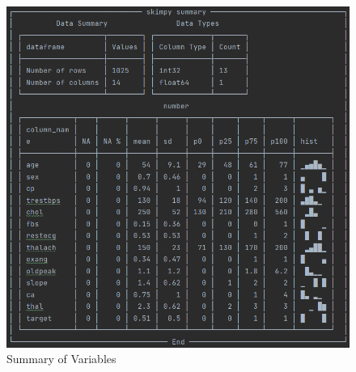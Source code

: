 \begin{figure}[b]
\includegraphics[width=\textwidth]{plots/Screenshot 2022-11-08 205742}
     \caption[Figure]{Summary of Variables} \label{fig:skim}
\end{figure}

